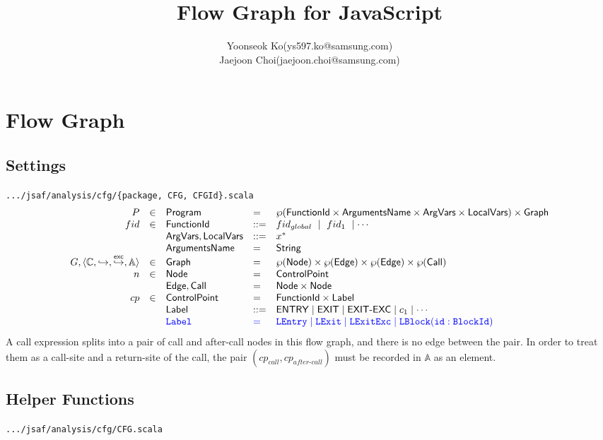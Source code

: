 \documentclass{article}
\title{Flow Graph for JavaScript}
\author{Yoonseok Ko(ys597.ko@samsung.com)
\\Jaejoon Choi(jaejoon.choi@samsung.com)}
\newcommand{\SF}[1]{\mbox{\textsf{#1}}}
\newcommand{\cfgnext}{\hookrightarrow}
\newcommand{\excnext}{\stackrel{\mathsf{exc}}{\hookrightarrow}}
\newcommand{\powerset}[1]{\wp(#1)}
\newcommand{\fid}{\SF{FunctionId}}
\newcommand{\pgm}{\SF{Program}}
\newcommand{\graph}{\SF{Graph}}
\newcommand{\args}{\SF{ArgVars}}
\newcommand{\vars}{\SF{LocalVars}}
\newcommand{\Edge}{\SF{Edge}}
\newcommand{\controlpoint}{\mathbb{C}}
\def\inblue{\color{blue}}
\begin{document}
\maketitle
\section{Flow Graph}
\subsection{Settings}
{\inblue\tt .../jsaf/analysis/cfg/\{package, CFG, CFGId\}.scala}\\
\[
\begin{array}{rllll}
P   & \in & \pgm & = & \powerset{\fid \times \SF{ArgumentsName} \times \args \times \vars} \times \graph \\
fid & \in & \fid & ::= & fid_{global} ~\mid~ fid_1 ~\mid \cdots \\
& & \args,\vars & ::= & x^* \\
& & \SF{ArgumentsName} & = & \SF{String} \\
G, \langle \controlpoint,\cfgnext,\excnext,\mathbb{A}\rangle & \in & \graph & = & \powerset{\SF{Node}} \times \powerset{\Edge} \times \powerset{\Edge} \times \powerset{\SF{Call}}\\
n & \in & \SF{Node} & = & \SF{ControlPoint}\\
& & \Edge,\SF{Call} & = & \SF{Node} \times \SF{Node}\\
cp & \in & \SF{ControlPoint} & = & \fid \times \SF{Label} \\
& & \SF{Label} & ::= & \SF{ENTRY} \mid \SF{EXIT} \mid \SF{EXIT-EXC} \mid c_1 \mid \cdots \\
&&\inblue{\tt Label}&\inblue = &\inblue
{\tt LEntry}\mid {\tt LExit}\mid {\tt LExitExc}\mid {\tt LBlock(id: BlockId)}
\\
\end{array}
\]
  A call expression splits into a pair of call and after-call nodes in this flow graph, and there is no edge between the pair. In order to treat them as a call-site and a return-site of the call, the pair $(cp_{\textit{call}},cp_{\textit{after-call}})$ must be recorded in $\mathbb{A}$ as an element.
\subsection{Helper Functions}
{\inblue\tt .../jsaf/analysis/cfg/CFG.scala}
\end{document}
